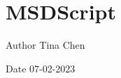 \chapter{MSDScript}
\hypertarget{index}{}\label{index}
\begin{DoxyAuthor}{Author}
Tina Chen 
\end{DoxyAuthor}
\begin{DoxyDate}{Date}
07-\/02-\/2023 
\end{DoxyDate}

